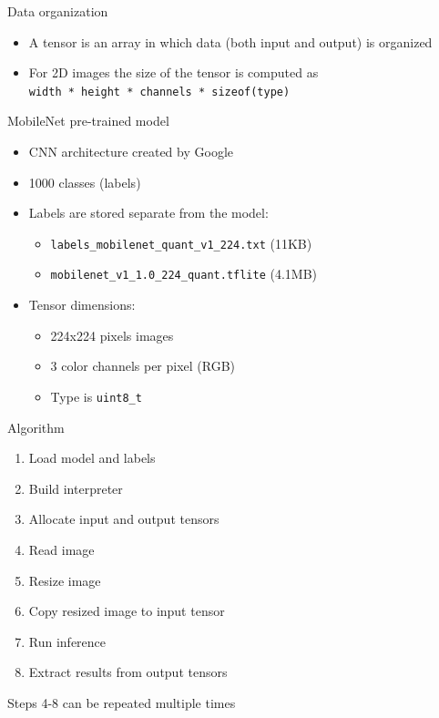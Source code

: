 \begin{frame}{Data organization}
  \begin{itemize}
	\item A tensor is an array in which data (both input and output) is organized
	\item For 2D images the size of the tensor is computed as \\ \texttt{width * height *
	channels * sizeof(type)}
  \end{itemize}
\end{frame}

\begin{frame}{MobileNet pre-trained model}
  \begin{itemize}
	\item CNN architecture created by Google
	\item 1000 classes (labels)
	\item Labels are stored separate from the model:
	  \begin{itemize}
		\item \texttt{labels\_mobilenet\_quant\_v1\_224.txt} (11KB)
		\item \texttt{mobilenet\_v1\_1.0\_224\_quant.tflite} (4.1MB)
	  \end{itemize}
	\item Tensor dimensions:
	  \begin{itemize}
		\item 224x224 pixels images
		\item 3 color channels per pixel (RGB)
		\item Type is \texttt{uint8\_t}
	  \end{itemize}
  \end{itemize}
\end{frame}

\begin{frame}{Algorithm}
  \begin{enumerate}
	\item Load model and labels
	\item Build interpreter
	\item Allocate input and output tensors
	\item Read image
	\item Resize image
	\item Copy resized image to input tensor
	\item Run inference
	\item Extract results from output tensors
  \end{enumerate}
\bigskip
Steps 4-8 can be repeated multiple times
\end{frame}

